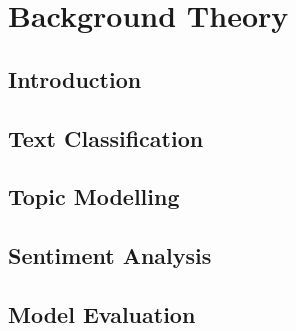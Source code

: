 
\chapter{Background Theory}

\label{ch:background}

\section{Introduction}
\label{sec:background_introduction}

\section{Text Classification}
\label{sec:bg_text_classification}

\section{Topic Modelling}
\label{sec:bg_topic_modelling}

\section{Sentiment Analysis}
\label{sec:bg_sentiment_analysis}

\section{Model Evaluation}
\label{sec:bg_model_evaluation}

